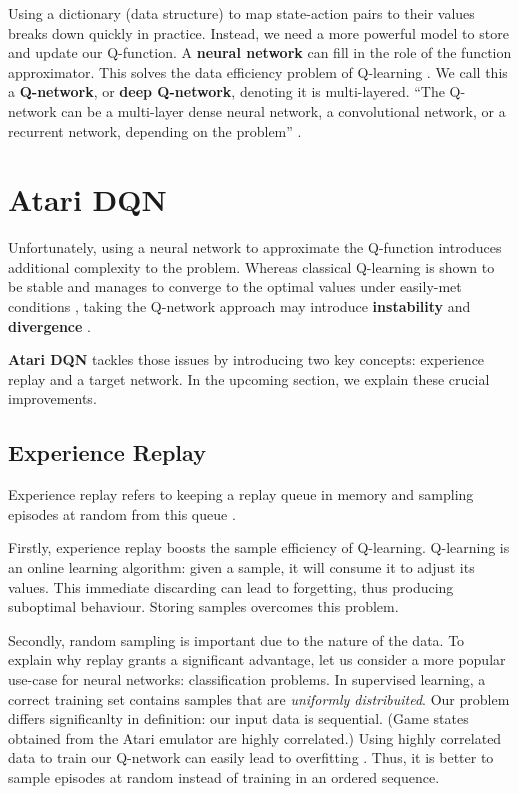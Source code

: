 Using a dictionary (data structure) to map state-action pairs to their values breaks down quickly in practice.
Instead, we need a more powerful model to store and update our Q-function.
A \textbf{neural network} can fill in the role of the function approximator.
This solves the data efficiency problem of Q-learning \cite{long-peak-rl}.
We call this a \textbf{Q-network}, or \textbf{deep Q-network}, denoting it is multi-layered.
``The Q-network can be a multi-layer dense neural network, a convolutional network, or a recurrent network, depending on the problem'' \cite{long-peak-rl}.

\section{Atari DQN}

Unfortunately, using a neural network to approximate the Q-function introduces additional complexity to the problem.
Whereas classical Q-learning is shown to be stable and manages to converge to the optimal values under easily-met conditions \cite{atari-dqn},
taking the Q-network approach may introduce \textbf{instability} and \textbf{divergence} \cite{long-peak-rl}.

\textbf{Atari DQN} \cite{atari-dqn} tackles those issues by introducing two key concepts: experience replay and a target network. In the upcoming section, we explain these crucial improvements.

\subsection{Experience Replay}

Experience replay refers to keeping a replay queue in memory and sampling episodes at random from this queue \cite{atari-dqn}.

Firstly, experience replay boosts the sample efficiency of Q-learning. Q-learning is an online learning algorithm: given a sample, it will consume it to adjust its values.
This immediate discarding can lead to forgetting, thus producing suboptimal behaviour.
Storing samples overcomes this problem.

Secondly, random sampling is important due to the nature of the data.
To explain why replay grants a significant advantage, let us consider a more popular use-case for neural networks: classification problems.
In supervised learning, a correct training set contains samples that are \emph{uniformly distribuited}.
Our problem differs significanlty in definition: our input data is sequential.
(Game states obtained from the Atari emulator are highly correlated.)
Using highly correlated data to train our Q-network can easily lead to overfitting \cite{jaromiru-dqn}.
Thus, it is better to sample episodes at random instead of training in an ordered sequence.

